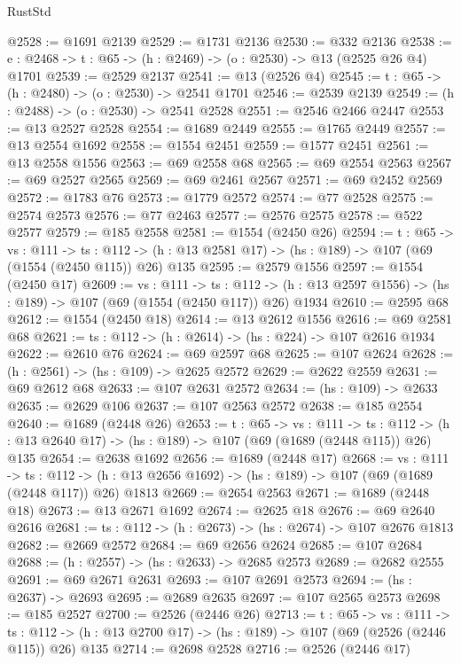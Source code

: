 \begin{lexlean}{RustStd}
\begin{coremodule}
{\begin{coremodule}
{{{{{{{{{@2528 := @1691 @2139
@2529 := @1731 @2136
@2530 := @332 @2136
@2538 := {e : @2468} -> {t : @65} -> (h : @2469) -> (o : @2530) -> @13 (@2525 @26 @4) @1701
@2539 := @2529 @2137
@2541 := @13 (@2526 @4)
@2545 := {t : @65} -> (h : @2480) -> (o : @2530) -> @2541 @1701
@2546 := @2539 @2139
@2549 := (h : @2488) -> (o : @2530) -> @2541 @2528
@2551 := @2546 @2466 @2447
@2553 := @13 @2527 @2528
@2554 := @1689 @2449
@2555 := @1765 @2449
@2557 := @13 @2554 @1692
@2558 := @1554 @2451
@2559 := @1577 @2451
@2561 := @13 @2558 @1556
@2563 := @69 @2558 @68
@2565 := @69 @2554 @2563
@2567 := @69 @2527 @2565
@2569 := @69 @2461 @2567
@2571 := @69 @2452 @2569
@2572 := @1783 @76
@2573 := @1779 @2572
@2574 := @77 @2528
@2575 := @2574 @2573
@2576 := @77 @2463
@2577 := @2576 @2575
@2578 := @522 @2577
@2579 := @185 @2558
@2581 := @1554 (@2450 @26)
@2594 := {t : @65} ->
  {vs : @111} ->
  {ts : @112} -> (h : @13 @2581 @17) -> (hs : @189) -> @107 (@69 (@1554 (@2450 @115)) @26) @135
@2595 := @2579 @1556
@2597 := @1554 (@2450 @17)
@2609 := {vs : @111} ->
  {ts : @112} -> (h : @13 @2597 @1556) -> (hs : @189) -> @107 (@69 (@1554 (@2450 @117)) @26) @1934
@2610 := @2595 @68
@2612 := @1554 (@2450 @18)
@2614 := @13 @2612 @1556
@2616 := @69 @2581 @68
@2621 := {ts : @112} -> (h : @2614) -> (hs : @224) -> @107 @2616 @1934
@2622 := @2610 @76
@2624 := @69 @2597 @68
@2625 := @107 @2624
@2628 := (h : @2561) -> (hs : @109) -> @2625 @2572
@2629 := @2622 @2559
@2631 := @69 @2612 @68
@2633 := @107 @2631 @2572
@2634 := (hs : @109) -> @2633
@2635 := @2629 @106
@2637 := @107 @2563 @2572
@2638 := @185 @2554
@2640 := @1689 (@2448 @26)
@2653 := {t : @65} ->
  {vs : @111} ->
  {ts : @112} -> (h : @13 @2640 @17) -> (hs : @189) -> @107 (@69 (@1689 (@2448 @115)) @26) @135
@2654 := @2638 @1692
@2656 := @1689 (@2448 @17)
@2668 := {vs : @111} ->
  {ts : @112} -> (h : @13 @2656 @1692) -> (hs : @189) -> @107 (@69 (@1689 (@2448 @117)) @26) @1813
@2669 := @2654 @2563
@2671 := @1689 (@2448 @18)
@2673 := @13 @2671 @1692
@2674 := @2625 @18
@2676 := @69 @2640 @2616
@2681 := {ts : @112} -> (h : @2673) -> (hs : @2674) -> @107 @2676 @1813
@2682 := @2669 @2572
@2684 := @69 @2656 @2624
@2685 := @107 @2684
@2688 := (h : @2557) -> (hs : @2633) -> @2685 @2573
@2689 := @2682 @2555
@2691 := @69 @2671 @2631
@2693 := @107 @2691 @2573
@2694 := (hs : @2637) -> @2693
@2695 := @2689 @2635
@2697 := @107 @2565 @2573
@2698 := @185 @2527
@2700 := @2526 (@2446 @26)
@2713 := {t : @65} ->
  {vs : @111} ->
  {ts : @112} -> (h : @13 @2700 @17) -> (hs : @189) -> @107 (@69 (@2526 (@2446 @115)) @26) @135
@2714 := @2698 @2528
@2716 := @2526 (@2446 @17)
}}}}}}}}}
\end{coremodule}}
\end{coremodule}
\end{lexlean}
